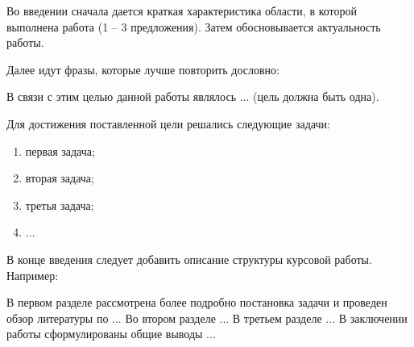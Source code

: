 %
Во введении сначала дается краткая характеристика области, в которой выполнена работа (1 -- 3 предложения). Затем обосновывается актуальность работы.

Далее идут фразы, которые лучше повторить дословно:

В связи с этим целью данной работы являлось ... (цель должна быть одна).

Для достижения поставленной цели решались следующие задачи:
\begin{enumerate}
    \item первая задача;
    \item вторая задача;
    \item третья задача;
    \item ...
\end{enumerate}

В конце введения следует добавить описание структуры курсовой работы. Например:

В первом разделе рассмотрена более подробно постановка задачи и проведен обзор литературы по ... Во втором разделе ... В третьем разделе ... В заключении работы сформулированы общие выводы ...